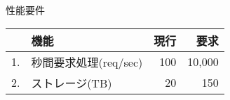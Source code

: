 \documentclass{article}
\begin{document}
  性能要件 \vspace{10pt} \\
  \begin{tabular}{|r|l|r|r|}
    \hline
    & 機能 & 現行 & 要求 \\
    \hline
    1. & 秒間要求処理(req/sec) & 100 & 10,000 \\  
    \hline
    2. & ストレージ(TB) &  20 & 150 \\
    \hline
  \end{tabular}  
\end{document}
